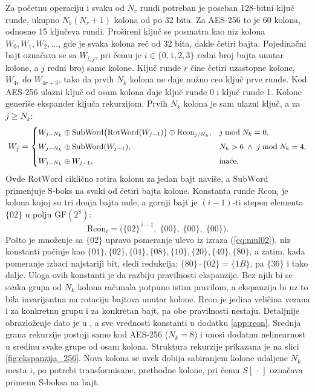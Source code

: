 Za početnu operaciju i svaku od $N_r$ rundi potreban je poseban 128-bitni ključ runde, ukupno $N_b(N_r+1)$ kolona od po 32 bita. Za AES-256 to je 60 kolona, odnosno 15 ključeva rundi.
\smallbreak
Prošireni ključ se posmatra kao niz kolona $W_0, W_1, W_2, \ldots$, gde je svaka kolona reč od 32 bita, dakle četiri bajta. Pojedinačni bajt označava se sa $W_{i,j}$, pri čemu je $i \in \{0,1,2,3\}$ redni broj bajta unutar kolone, a $j$ redni broj same kolone. Ključ runde $r$ čine četiri uzastopne kolone, $W_{4r}$ do $W_{4r+3}$, tako da prvih $N_k$ kolona ne daje nužno ceo ključ prve runde. Kod AES-256 ulazni ključ od osam kolona daje ključ runde 0 i ključ runde 1.
\smallbreak
Kolone generiše ekspander ključa rekurzijom. Prvih $N_k$ kolona je sam ulazni ključ, a za $j \geq N_k$:
\begin{equation}
\small
W_j =
\begin{cases}
W_{j-N_k} \oplus \mathrm{SubWord}\big(\mathrm{RotWord}(W_{j-1})\big) \oplus \mathrm{Rcon}_{j/N_k}, & j \bmod N_k = 0,\\[4pt]
W_{j-N_k} \oplus \mathrm{SubWord}(W_{j-1}), & N_k > 6 \;\wedge\; j \bmod N_k = 4,\\[4pt]
W_{j-N_k} \oplus W_{j-1}, & \text{inače},
\end{cases}
\label{eq:key_expansion}
\end{equation}
Ovde $\mathrm{RotWord}$ ciklično rotira kolonu za jedan bajt naviše, a $\mathrm{SubWord}$ primenjuje S-boks na svaki od četiri bajta kolone.
\smallbreak
Konstanta runde $\mathrm{Rcon}_i$ je kolona kojoj su tri donja bajta nule, a gornji bajt je $(i{-}1)$-ti stepen elementa $\{02\}$ u polju $\mathrm{GF}(2^8)$:
\begin{equation}
    \mathrm{Rcon}_i = \big(\{02\}^{\,i-1},\; \{00\},\; \{00\},\; \{00\}\big).
    \label{eq:rcon}
\end{equation}
Pošto je množenje sa $\{02\}$ upravo pomeranje ulevo iz izraza (\ref{eq:mul02}), niz konstanti počinje kao $\{01\}, \{02\}, \{04\}, \{08\}, \{10\}, \{20\}, \{40\}, \{80\}$, a zatim, kada pomeranje izbaci najstariji bit, sledi redukcija: $\{80\} \cdot \{02\} = \{1B\}$, pa $\{36\}$ i tako dalje. Uloga ovih konstanti je da razbiju pravilnosti ekspanzije. Bez njih bi se svaka grupa od $N_k$ kolona računala potpuno istim pravilom, a ekspanzija bi uz to bila invarijantna na rotaciju bajtova unutar kolone. $\mathrm{Rcon}$ je jedina veličina vezana i za konkretnu grupu i za konkretan bajt, pa obe pravilnosti nestaju. Detaljnije obrazloženje dato je u \cite{daemen_rijndael}, a sve vrednosti konstanti u dodatku \ref{app:rcon}.
\smallbreak
Srednja grana rekurzije postoji samo kod AES-256 ($N_k = 8$) i unosi dodatnu nelinearnost u sredinu svake grupe od osam kolona. Struktura rekurzije prikazana je na slici \ref{fig:ekspanzija_256}. Nova kolona se uvek dobija sabiranjem kolone udaljene $N_k$ mesta i, po potrebi transformisane, prethodne kolone, pri čemu $S[\,\cdot\,]$ označava primenu S-boksa na bajt.

